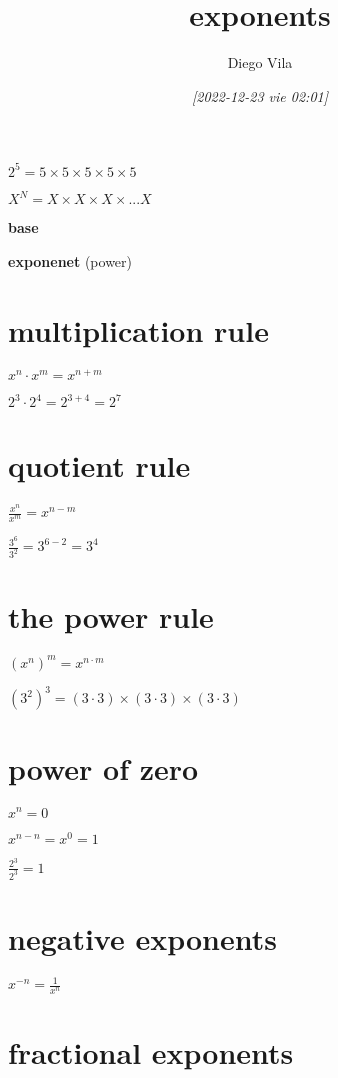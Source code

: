 \documentclass[11pt]{article}
\author{Diego Vila}
\date{\textit{[2022-12-23 vie 02:01]}}
\title{exponents}
\begin{document}
\maketitle
\tableofcontents

\(2^5 = 5 \times 5 \times 5 \times 5 \times 5\)

\(X^N = X \times X \times X \times ... X\)

\textbf{base}

\textbf{exponenet} (power)


\section{multiplication rule}
\label{sec:org05ea438}

\(x^n \cdot x^m = x^{n+m}\)

\(2^3 \cdot 2^4 = 2^{3 + 4} = 2^7\)

\section{quotient rule}
\label{sec:org7b6b147}

\(\frac{x^n}{x^m} = x^{n - m}\)

\(\frac{3^6}{3^2} = 3^{6 - 2} = 3^4\)

\section{the power rule}
\label{sec:org6676416}

\((x^n)^m = x^{n \cdot m}\)

\((3^2)^3 = (3 \cdot 3) \times (3 \cdot 3) \times (3 \cdot 3)\)

\section{power of zero}
\label{sec:orgea96abb}

\(x^n=0\)

\(x^{n - n} = x^0 = 1\)

\(\frac{2^3}{2^3} = 1\)

\section{negative exponents}
\label{sec:orgedc9c6e}

\(x^{-n} = \frac{1}{x^n}\)

\section{fractional exponents}
\label{sec:org57241cf}
\end{document}
